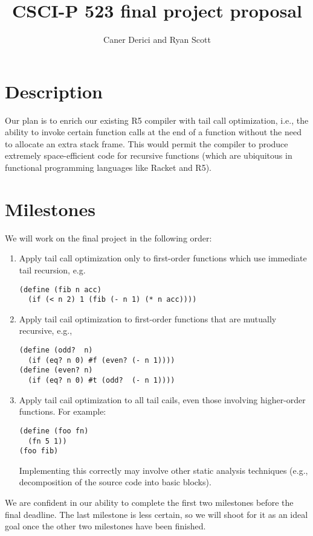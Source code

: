 \documentclass[12pt]{article}
\begin{document}
 
\title{CSCI-P 523 final project proposal\vspace{-2ex}}
\author{Caner Derici and Ryan Scott} 
 
\maketitle

\section{Description}

Our plan is to enrich our existing R5 compiler with tail call optimization,
i.e., the ability to invoke certain function calls at the end of a function without
the need to allocate an extra stack frame. This would permit the compiler to produce
extremely space-efficient code for recursive functions (which are ubiquitous in
functional programming languages like Racket and R5).

\section{Milestones}

We will work on the final project in the following order:

\begin{enumerate}
 \item Apply tail call optimization only to first-order functions which use immediate
       tail recursion, e.g.     
\begin{verbatim}
(define (fib n acc)
  (if (< n 2) 1 (fib (- n 1) (* n acc))))
\end{verbatim}
 \item Apply tail cail optimization to first-order functions that are mutually
       recursive, e.g.,
\begin{verbatim}
(define (odd?  n)
  (if (eq? n 0) #f (even? (- n 1))))
(define (even? n)
  (if (eq? n 0) #t (odd?  (- n 1))))
\end{verbatim}
 \item Apply tail cail optimization to all tail cails, even those involving
       higher-order functions. For example:
\begin{verbatim}
(define (foo fn)
  (fn 5 1))
(foo fib)
\end{verbatim}

       Implementing this correctly may involve other static analysis techniques
       (e.g., decomposition of the source code into basic blocks).

\end{enumerate}

We are confident in our ability to complete the first two milestones before the final
deadline. The last milestone is less certain, so we will shoot for it as an ideal
goal once the other two milestones have been finished.
\end{document}
